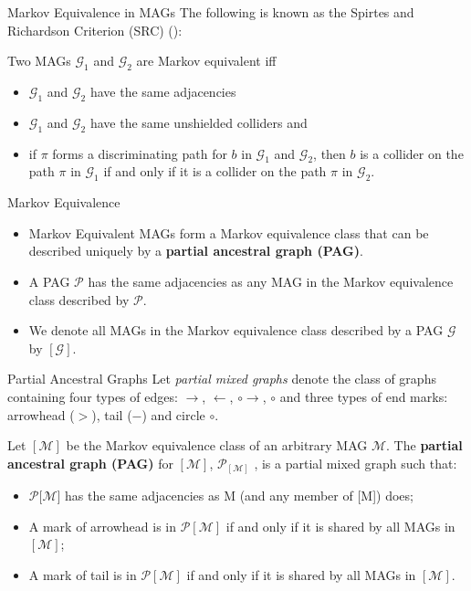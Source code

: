 \documentclass[english, compress, red]{beamer}
\begin{document}
\begin{frame}{Markov Equivalence in MAGs}
	The following is known as the Spirtes and Richardson Criterion (SRC) (\cite{spirtes1996polynomial}):
	
	\begin{theorem}
		 Two MAGs $\mathcal{G}_1$ and $\mathcal{G}_2$ are Markov equivalent iff
		 \begin{itemize}
		 	\item $\mathcal{G}_1$ and $\mathcal{G}_2$ have the same adjacencies
		 	\item $\mathcal{G}_1$ and $\mathcal{G}_2$ have the same unshielded colliders and
		 	\item if $\pi$ forms a discriminating path for $b$ in $\mathcal{G}_1$ and $\mathcal{G}_2$, then $b$ is a collider on the path $\pi$ in $\mathcal{G}_1$ if and only if it is a collider on the path $\pi$ in $\mathcal{G}_2$.
		 \end{itemize}
	\end{theorem}
\end{frame}

\begin{frame}{Markov Equivalence}
	\begin{itemize}
	    \item Markov Equivalent MAGs form a Markov equivalence class that can be described uniquely by a \textbf{partial ancestral graph (PAG)}.
	    \item A PAG $\mathcal{P}$ has the same adjacencies as any MAG in the Markov equivalence class described by $\mathcal{P}$.
	    \item We denote all MAGs in the Markov equivalence class described by a PAG $\mathcal{G}$ by $[\mathcal{G}]$.
	\end{itemize}
\end{frame}

\begin{frame}{Partial Ancestral Graphs}
	Let \textit{partial mixed graphs} denote the class of graphs containing four types of edges: $\rightarrow$, $\leftarrow$, $\circ \rightarrow$, $\circ$ and three types of end marks: arrowhead ($>$), tail ($-$) and circle $\circ$.
	
	\begin{definition}Let $[\mathcal{M}]$ be the Markov equivalence class of an arbitrary MAG $\mathcal{M}$.
		The \textbf{partial ancestral graph (PAG)} for $[\mathcal{M}]$, $\mathcal{P}_{[\mathcal{M}]}$ , is a partial
		mixed graph such that:
		
		\begin{itemize}
			\item $\mathcal{P}[\mathcal{M]}$ has the same adjacencies as M (and any member of [M]) does;
			\item A mark of arrowhead is in $\mathcal{P}[\mathcal{M}]$ if and only if it is shared by all MAGs in $[\mathcal{M}]$; 
			\item A mark of tail is in $\mathcal{P}[\mathcal{M}]$ if and only if it is shared by all MAGs in $[\mathcal{M}]$.
		\end{itemize}	
	\end{definition}
\end{frame}
\end{document}

